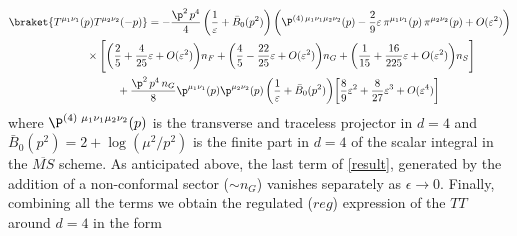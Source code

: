 \documentclass[a4paper,11pt,openright,twoside]{book}
\numberwithin{equation}{section}
\begin{document}
{{\begin{align}
	\label{result}
	\braket{T^{\mu_1\nu_1}(p)T^{\mu_2\nu_2}(-p)}&=-\frac{\p^2\,p^4}{4}\,\bigg(\frac{1}{\varepsilon}+\bar{B}_0(p^2)\bigg)\,\bigg(\P^{(4)\,\mu_1\nu_1\mu_2\nu_2}(p)-\frac{2}{9}\varepsilon\,\pi^{\mu_1\nu_1}(p)\,\pi^{\mu_2\nu_2}(p)+O(\varepsilon^2)\bigg)\notag\\
	&\hspace{-2cm}\times\Bigg[\bigg(\frac{2}{5}+\frac{4}{25}\varepsilon+O(\varepsilon^2)\bigg)n_F+\bigg(\frac{4}{5}-\frac{22}{25}\varepsilon+O(\varepsilon^2)\bigg)n_G+\bigg(\frac{1}{15}+\frac{16}{225}\varepsilon+O(\varepsilon^2)\bigg)n_S\Bigg]\notag\\
	&\hspace{-1cm}+\frac{\p^2\,p^4\,n_G}{8}\p^{\mu_1\nu_1}(p)\p^{\mu_2\nu_2}(p)\,\bigg(\frac{1}{\varepsilon}+\bar{B}_0(p^2)\bigg)\bigg[\frac{8}{9}\varepsilon^2+\frac{8}{27}\varepsilon^3+O(\varepsilon^4)\bigg]
\end{align}
where $\P^{ (4)\,\,\mu_1\nu_1\mu_2\nu_2}(p)$ is the transverse and traceless projector in $d=4$ and $\bar{B}_0(p^2)= 2 + \log(\mu^2/p^2)$ is the finite part in $d=4$ of the scalar integral in the $\overline{MS}$ scheme. As anticipated above, the last term of \eqref{result}, generated by the addition of a non-conformal sector ($\sim n_G$) vanishes separately as $\epsilon\to 0$. Finally, combining all the terms we obtain the regulated ($reg$) expression of the $TT$ around $d=4$ in the form

}}
\end{document}
